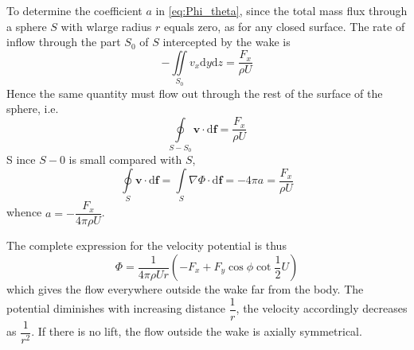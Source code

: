 \documentclass[conference]{IEEEtran}
\theoremstyle{definition}
\theoremstyle{remark}
\begin{document}
    To determine the coefficient $a$ in \ref{eq:Phi_theta}, since the total mass flux through a sphere $S$ with wlarge radius $r$ equals zero, as for any closed surface. The rate of inflow through the part $S_0$ of $S$ intercepted by the wake is
    \begin{equation*}
        -\iint\limits_{S_0} v_x \mathrm{d} y \mathrm{d} z = \dfrac{F_x}{\rho U}
    \end{equation*}
    Hence the same quantity must flow out through the rest of the surface of the sphere, i.e.
    \begin{equation*}
        \oint\limits_{S - S_0} \mathbf{v} \cdot \mathrm{d} \mathbf{f} = \dfrac{F_x}{\rho U}
    \end{equation*}S
    ince $S-0$ is small compared with $S$,
    \begin{equation*}
        \oint\limits_{S} \mathbf{v} \cdot \mathrm{d} \mathbf{f} = \int\limits_S \nabla \Phi \cdot \mathrm{d} \mathbf{f} = -4\pi a = \dfrac{F_x}{\rho U}
    \end{equation*}
    whence $a = -\dfrac{F_x}{4 \pi \rho U}$.

    The complete expression for the velocity potential is thus
    \begin{equation*}
        \Phi = \dfrac1{4\pi \rho U r}(-F_x + F_y \cos \phi \cot \dfrac12 U)
    \end{equation*}
    which gives the flow everywhere outside the wake far from the body. The potential diminishes with increasing distance $\dfrac1r$, the velocity accordingly decreases as $\dfrac1{r^2}$. If there is no lift, the flow outside the wake is axially symmetrical.
\end{document}
